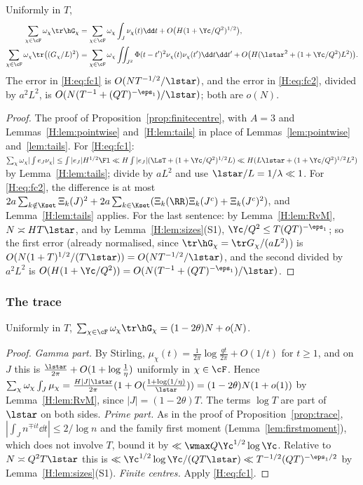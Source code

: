 \begin{proposition}\label{H:prop:fc}
Uniformly in $T$,
\begin{align}
\sum_{\chi\in\cF}\omega_\chi\tr\hG_\chi&=\sum_{\chi\in\cF}\omega_\chi\int_J\nu_\chi(t)\dd t+O\big(H(1+\Yc/Q^2)^{1/2}\big),\label{H:eq:fc1}\\
\sum_{\chi\in\cF}\omega_\chi\tr\big((G_\chi/L)^2\big)&=\sum_{\chi\in\cF}\omega_\chi\iint_{J^2}\Phi(t-t')^2\nu_\chi(t)\nu_\chi(t')\dd t\dd t'+O\big(H(\lstar^2+(1+\Yc/Q^2)L^2)\big).\label{H:eq:fc2}
\end{align}
The error in \eqref{H:eq:fc1} is $O(NT^{-1/2}/\lstar)$, and the error in \eqref{H:eq:fc2}, divided by $a^2L^2$, is $O(N(T^{-1}+(QT)^{-\eps_1})/\lstar)$; both are $o(N)$.
\end{proposition}
\begin{proof}
The proof of Proposition~\ref{prop:finitecentre}, with $A=3$ and Lemmas~\ref{H:lem:pointwise} and~\ref{H:lem:tails} in place of Lemmas~\ref{lem:pointwise} and~\ref{lem:tails}. For \eqref{H:eq:fc1}: $\sum_\chi\omega_\chi|\int e_J\nu_\chi|\le\int|e_J|H^{1/2}\Fl\ll H\int|e_J|(\LsT+(1+\Yc/Q^2)^{1/2}L)\ll H(L\lstar+(1+\Yc/Q^2)^{1/2}L^2)$ by Lemma~\ref{H:lem:tails}; divide by $aL^2$ and use $\lstar/L=1/\lambda\ll1$. For \eqref{H:eq:fc2}, the difference is at most $2a\sum_{k\notin\Kset}\Xi_k(J)^2+2a\sum_{k\in\Kset}(\Xi_k(\RR)\Xi_k(J^c)+\Xi_k(J^c)^2)$, and Lemma~\ref{H:lem:tails} applies. For the last sentence: by Lemma~\ref{H:lem:RvM}, $N\asymp HT\lstar$, and by Lemma~\ref{H:lem:sizes}(S1), $\Yc/Q^2\le T(QT)^{-\eps_1}$; so the first error (already normalised, since $\tr\hG_\chi=\tr G_\chi/(aL^2)$) is $O(N(1+T)^{1/2}/(T\lstar))=O(NT^{-1/2}/\lstar)$, and the second divided by $a^2L^2$ is $O(H(1+\Yc/Q^2))=O(N(T^{-1}+(QT)^{-\eps_1})/\lstar)$.
\end{proof}

\subsubsection*{The trace}
\begin{proposition}\label{H:prop:trace}
Uniformly in $T$, $\sum_{\chi\in\cF}\omega_\chi\tr\hG_\chi=(1-2\theta)N+o(N)$.
\end{proposition}
\begin{proof}
\emph{Gamma part.} By Stirling, $\mu_\chi(t)=\frac1{2\pi}\log\frac{qt}{2\pi}+O(1/t)$ for $t\ge1$, and on $J$ this is $\frac{\lstar}{2\pi}+O(1+\log\frac1\eta)$ uniformly in $\chi\in\cF$. Hence $\sum_\chi\omega_\chi\int_J\mu_\chi=\frac{H|J|\lstar}{2\pi}(1+O(\frac{1+\log(1/\eta)}{\lstar}))=(1-2\theta)N(1+o(1))$ by Lemma~\ref{H:lem:RvM}, since $|J|=(1-2\theta)T$. The terms $\log T$ are part of $\lstar$ on both sides.
\emph{Prime part.} As in the proof of Proposition~\ref{prop:trace}, $|\int_Jn^{\mp it}\dd t|\le2/\log n$ and the family first moment (Lemma~\ref{lem:firstmoment}), which does not involve $T$, bound it by $\ll\wmax Q\Yc^{1/2}\log\Yc$. Relative to $N\asymp Q^2T\lstar$ this is $\ll\Yc^{1/2}\log\Yc/(QT\lstar)\ll T^{-1/2}(QT)^{-\eps_1/2}$ by Lemma~\ref{H:lem:sizes}(S1).
\emph{Finite centres.} Apply \eqref{H:eq:fc1}.
\end{proof}

